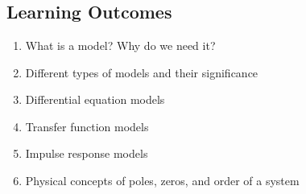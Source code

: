 \documentclass[../notes-main.tex]{subfiles}
\begin{document}
\chapter{}
\section*{Learning Outcomes}
\begin{enumerate}[label=\blacktriangleright, leftmargin=*, itemsep=0.5em]
    \item What is a model? Why do we need it?
    \item Different types of models and their significance
    \item Differential equation models
    \item Transfer function models
    \item Impulse response models
    \item Physical concepts of poles, zeros, and order of a system
\end{enumerate}
\newpage

\newpage

\newpage

\newpage

\end{document}
